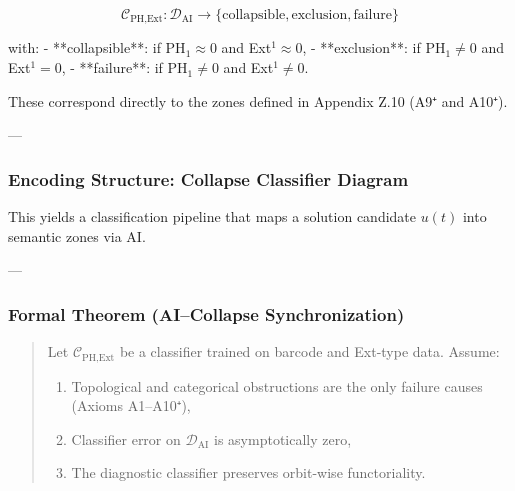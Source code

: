 \documentclass[11pt]{article}
\begin{document}
\begin{axiom}
\begin{axiom}
{{\[
\mathcal{C}_{\text{PH,Ext}} : \mathcal{D}_{\text{AI}} \to \{ \text{collapsible}, \text{exclusion}, \text{failure} \}
\]

with:
- **collapsible**: if PH$_1 \approx 0$ and Ext$^1 \approx 0$,
- **exclusion**: if PH$_1 \neq 0$ and Ext$^1 = 0$,
- **failure**: if PH$_1 \neq 0$ and Ext$^1 \neq 0$.

These correspond directly to the zones defined in Appendix Z.10 (A9⁺ and A10⁺).

---

\subsubsection*{Encoding Structure: Collapse Classifier Diagram}

\begin{center}
\end{center}

This yields a classification pipeline that maps a solution candidate \( u(t) \) into semantic zones via AI.

---

\subsubsection*{Formal Theorem (AI–Collapse Synchronization)}

\begin{quote}
Let \( \mathcal{C}_{\text{PH,Ext}} \) be a classifier trained on barcode and Ext-type data.  
Assume:

\begin{enumerate}
  \item Topological and categorical obstructions are the only failure causes (Axioms A1–A10⁺),
  \item Classifier error on \(\mathcal{D}_{\text{AI}}\) is asymptotically zero,
  \item The diagnostic classifier preserves orbit-wise functoriality.
\end{enumerate}


\end{quote}}}
\end{axiom}
\end{axiom}
\end{document}
